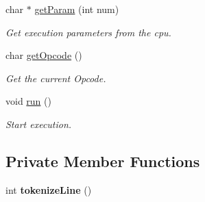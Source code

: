 \begin{DoxyCompactItemize}
char $\ast$ \hyperlink{classcCPU_a891d9b77e1818ca247e9d76f4db99415}{get\-Param} (int num)
\begin{DoxyCompactList}\small\item\em \-Get execution parameters from the cpu. \end{DoxyCompactList}\item 
char \hyperlink{classcCPU_a987e1ab511c71dcde48411f5bb16f9d8}{get\-Opcode} ()
\begin{DoxyCompactList}\small\item\em \-Get the current \-Opcode. \end{DoxyCompactList}\item 
void \hyperlink{classcCPU_aee300d68026ba9f13d5434ff82f0372a}{run} ()
\begin{DoxyCompactList}\small\item\em \-Start execution. \end{DoxyCompactList}\end{DoxyCompactItemize}
\subsection*{\-Private \-Member \-Functions}
\begin{DoxyCompactItemize}
\item 
\hypertarget{classcCPU_a62812ecc1a65c296fb4795b24b451f4e}{int {\bfseries tokenize\-Line} ()}\label{d2/dc6/classcCPU_a62812ecc1a65c296fb4795b24b451f4e}

\end{DoxyCompactItemize}
